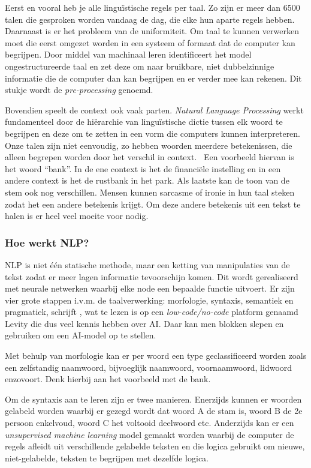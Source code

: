 Eerst en vooral heb je alle linguïstische regels per taal. Zo zijn er meer dan 6500 talen die gesproken worden vandaag de dag, die elke hun aparte regels hebben.
Daarnaast is er het probleem van de uniformiteit. Om taal te kunnen verwerken moet die eerst omgezet worden in een systeem of formaat dat de computer kan begrijpen. Door middel van machinaal leren identificeert het model ongestructureerde taal en zet deze om naar bruikbare, niet dubbelzinnige informatie die de computer dan kan begrijpen en er verder mee kan rekenen. Dit stukje wordt de \textit{pre-processing} genoemd.

Bovendien speelt de context ook vaak parten. \textit{Natural Language Processing} werkt fundamenteel door de hiërarchie van linguïstische dictie tussen elk woord te begrijpen en deze om te zetten in een vorm die computers kunnen interpreteren. Onze talen zijn niet eenvoudig, zo hebben woorden meerdere betekenissen, die alleen begrepen worden door het verschil in context.~\autocite{Kleinings2022} Een voorbeeld hiervan is het woord ``bank''. In de ene context is het de financiële instelling en in een andere context is het de rustbank in het park.
Als laatste kan de toon van de stem ook nog verschillen. Mensen kunnen sarcasme of ironie in hun taal steken zodat het een andere betekenis krijgt. Om deze andere betekenis uit een tekst te halen is er heel veel moeite voor nodig.

\subsubsection{Hoe werkt NLP?}
NLP is niet één statische methode, maar een ketting van manipulaties van de tekst zodat er meer lagen informatie tevoorschijn komen. Dit wordt gerealiseerd met neurale netwerken waarbij elke node een bepaalde functie uitvoert.
Er zijn vier grote stappen i.v.m. de taalverwerking: morfologie, syntaxis, semantiek en pragmatiek, schrijft \textcite{Kleinings2022}, wat te lezen is op een \textit{low-code/no-code} platform genaamd Levity die dus veel kennis hebben over AI. Daar kan men blokken slepen en gebruiken om een AI-model op te stellen.

Met behulp van morfologie kan er per woord een type geclassificeerd worden zoals een zelfstandig naamwoord, bijvoeglijk naamwoord, voornaamwoord, lidwoord enzovoort. Denk hierbij aan het voorbeeld met de bank.

Om de syntaxis aan te leren zijn er twee manieren. Enerzijds kunnen er woorden gelabeld worden waarbij er gezegd wordt dat woord A de stam is, woord B de 2e persoon enkelvoud, woord C het voltooid deelwoord etc. Anderzijds kan er een \textit{unsupervised machine learning} model gemaakt worden waarbij de computer de regels afleidt uit verschillende gelabelde teksten en die logica gebruikt om nieuwe, niet-gelabelde, teksten te begrijpen met dezelfde logica.

